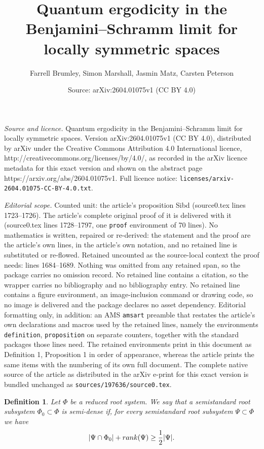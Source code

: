 \documentclass[10pt,a4paper]{amsart}
\title{Quantum ergodicity in the Benjamini--Schramm limit for locally symmetric spaces}
\author{Farrell Brumley, Simon Marshall, Jasmin Matz, Carsten Peterson}
\date{Source: arXiv:2604.01075v1 (CC BY 4.0)}
\newtheorem{definition}{Definition}
\begin{document}
\maketitle

\noindent\emph{Source and licence.} Quantum ergodicity in the Benjamini--Schramm limit for locally symmetric spaces. Version arXiv:2604.01075v1 (CC BY 4.0), distributed by arXiv under the Creative Commons Attribution 4.0 International licence, http://creativecommons.org/licenses/by/4.0/, as recorded in the arXiv licence metadata for this exact version and shown on the abstract page https://arxiv.org/abs/2604.01075v1. Full licence notice: \texttt{licenses/arxiv-2604.01075-CC-BY-4.0.txt}.\par\smallskip

\noindent\textit{Editorial scope.} Counted unit: the article's proposition Sibd (source0.tex lines 1723--1726). The article's complete original proof of it is delivered with it (source0.tex lines 1728--1797, one \texttt{proof} environment of 70 lines). No mathematics is written, repaired or re-derived: the statement and the proof are the article's own lines, in the article's own notation, and no retained line is substituted or re-flowed.  Retained uncounted as the source-local context the proof needs: lines 1684--1689.  Nothing was omitted from any retained span, so the package carries no omission record.  No retained line contains a citation, so the wrapper carries no bibliography and no bibliography entry.  No retained line contains a figure environment, an image-inclusion command or drawing code, so no image is delivered and the package declares no asset dependency.  Editorial formatting only, in addition: an AMS \texttt{amsart} preamble that restates the article's own declarations and macros used by the retained lines, namely the environments \texttt{definition}, \texttt{proposition} on separate counters, together with the standard packages those lines need.  The retained environments print in this document as Definition 1, Proposition 1 in order of appearance, whereas the article prints the same items with the numbering of its own full document.  The complete native source of the article as distributed in the arXiv e-print for this exact version is bundled unchanged as \texttt{sources/197636/source0.tex}.
\begin{definition}\label{def:big}
Let $\Phi$ be a reduced root system. We say that a semistandard root subsystem $\Phi_0\subset\Phi$ is {\normalfont semi-dense} if, for every semistandard root subsystem $\Psi\subset\Phi$ we have
    \begin{equation}\label{eqn_root_ineq}
        |\Psi \cap \Phi_0| + \textnormal{rank}(\Psi) \geq \frac{1}{2} |\Psi|. 
    \end{equation}
    \end{definition}
\end{document}
